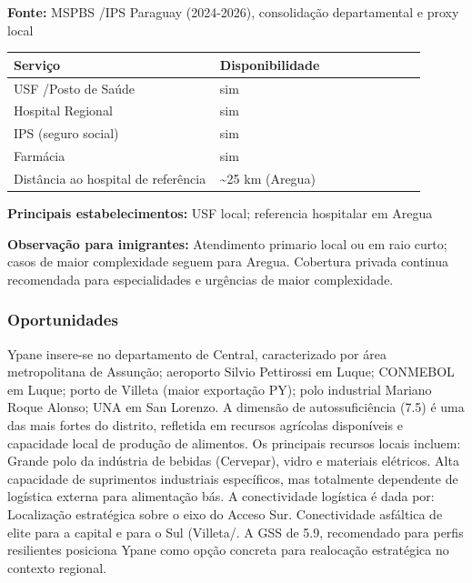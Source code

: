 \textbf{Fonte:} MSPBS /\allowbreak  IPS Paraguay (2024-2026), consolidação
departamental e proxy local

{\def\LTcaptype{none} %
\begin{longtable}{@{}>{\raggedright\arraybackslash}p{0.45\linewidth} >{\raggedright\arraybackslash}p{0.45\linewidth}@{}}
\toprule\noalign{}
Serviço & Disponibilidade \\
\midrule\noalign{}
\endhead
\bottomrule\noalign{}
\endlastfoot
USF /\allowbreak  Posto de Saúde & sim \\
Hospital Regional & sim \\
IPS (seguro social) & sim \\
Farmácia & sim \\
Distância ao hospital de referência & \textasciitilde25 km (Aregua) \\
\end{longtable}
}

\textbf{Principais estabelecimentos:} USF local; referencia hospitalar
em Aregua

\textbf{Observação para imigrantes:} Atendimento primario local ou em
raio curto; casos de maior complexidade seguem para Aregua. Cobertura
privada continua recomendada para especialidades e urgências de maior
complexidade.

\subsubsection*{Oportunidades}\label{oport-ypane-1118}
Ypane insere-se no departamento de Central, caracterizado por área metropolitana de Assunção; aeroporto Silvio Pettirossi em Luque; CONMEBOL em Luque; porto de Villeta (maior exportação PY); polo industrial Mariano Roque Alonso; UNA em San Lorenzo. A dimensão de autossuficiência (7.5) é uma das mais fortes do distrito, refletida em recursos agrícolas disponíveis e capacidade local de produção de alimentos. Os principais recursos locais incluem: Grande polo da indústria de bebidas (Cervepar), vidro e materiais elétricos. Alta capacidade de suprimentos industriais específicos, mas totalmente dependente de logística externa para alimentação bás. A conectividade logística é dada por: Localização estratégica sobre o eixo do Acceso Sur. Conectividade asfáltica de elite para a capital e para o Sul (Villeta/. A GSS de 5.9, recomendado para perfis resilientes posiciona Ypane como opção concreta para realocação estratégica no contexto regional.

